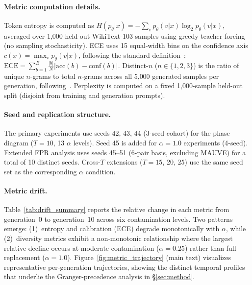 \paragraph{Metric computation details.}
Token entropy is computed as $H(p_\theta | x) = -\sum_{v} p_\theta(v|x) \log_2 p_\theta(v|x)$, averaged over 1{,}000 held-out WikiText-103 samples using greedy teacher-forcing (no sampling stochasticity).
ECE uses 15 equal-width bins on the confidence axis $c(x) = \max_v p_\theta(v|x)$, following the standard definition~\citep{naeini2015obtaining}:
$\mathrm{ECE} = \sum_{b=1}^{B} \frac{|b|}{N} |\mathrm{acc}(b) - \mathrm{conf}(b)|$.
Distinct-$n$ ($n \in \{1, 2, 3\}$) is the ratio of unique $n$-grams to total $n$-grams across all 5{,}000 generated samples per generation, following~\citet{li2016diversity}.
Perplexity is computed on a fixed 1{,}000-sample held-out split (disjoint from training and generation prompts).

\paragraph{Seed and replication structure.}
The primary experiments use seeds 42, 43, 44 (3-seed cohort) for the phase diagram ($T{=}10$, 13 $\alpha$ levels).
Seed 45 is added for $\alpha{=}1.0$ experiments (4-seed).
Extended FPR analysis uses seeds 45--51 (6-pair basis, excluding MAUVE) for a total of 10 distinct seeds.
Cross-$T$ extensions ($T{=}15$, $20$, $25$) use the same seed set as the corresponding $\alpha$ condition.

\paragraph{Metric drift.}
Table~\ref{tab:drift_summary} reports the relative change in each metric from generation~0 to generation~10 across six contamination levels.
Two patterns emerge: (1)~entropy and calibration (ECE) degrade monotonically with $\alpha$, while (2)~diversity metrics exhibit a non-monotonic relationship where the largest relative decline occurs at moderate contamination ($\alpha{=}0.25$) rather than full replacement ($\alpha{=}1.0$).
Figure~\ref{fig:metric_trajectory} (main text) visualizes representative per-generation trajectories, showing the distinct temporal profiles that underlie the Granger-precedence analysis in \S\ref{sec:method}.

